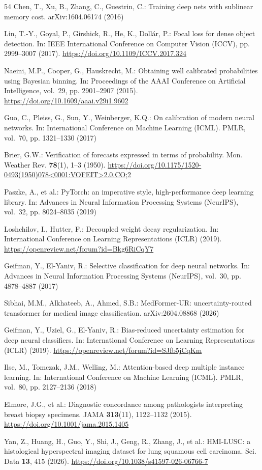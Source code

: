 \documentclass{svproc}
\begin{document}
\begin{thebibliography}{54}
Chen, T., Xu, B., Zhang, C., Guestrin, C.: Training deep nets with sublinear memory cost. arXiv:1604.06174 (2016)

Lin, T.-Y., Goyal, P., Girshick, R., He, K., Doll\'{a}r, P.: Focal loss for dense object detection. In: IEEE International Conference on Computer Vision (ICCV), pp. 2999--3007 (2017). \url{https://doi.org/10.1109/ICCV.2017.324}

Naeini, M.P., Cooper, G., Hauskrecht, M.: Obtaining well calibrated probabilities using Bayesian binning. In: Proceedings of the AAAI Conference on Artificial Intelligence, vol.~29, pp. 2901--2907 (2015). \url{https://doi.org/10.1609/aaai.v29i1.9602}

Guo, C., Pleiss, G., Sun, Y., Weinberger, K.Q.: On calibration of modern neural networks. In: International Conference on Machine Learning (ICML). PMLR, vol.~70, pp. 1321--1330 (2017)

Brier, G.W.: Verification of forecasts expressed in terms of probability. Mon. Weather Rev. \textbf{78}(1), 1--3 (1950). \url{https://doi.org/10.1175/1520-0493(1950)078<0001:VOFEIT>2.0.CO;2}

Paszke, A., et al.: PyTorch: an imperative style, high-performance deep learning library. In: Advances in Neural Information Processing Systems (NeurIPS), vol.~32, pp. 8024--8035 (2019)

Loshchilov, I., Hutter, F.: Decoupled weight decay regularization. In: International Conference on Learning Representations (ICLR) (2019). \url{https://openreview.net/forum?id=Bkg6RiCqY7}

Geifman, Y., El-Yaniv, R.: Selective classification for deep neural networks. In: Advances in Neural Information Processing Systems (NeurIPS), vol.~30, pp. 4878--4887 (2017)

Sibhai, M.M., Alkhateeb, A., Ahmed, S.B.: MedFormer-UR: uncertainty-routed transformer for medical image classification. arXiv:2604.08868 (2026)

Geifman, Y., Uziel, G., El-Yaniv, R.: Bias-reduced uncertainty estimation for deep neural classifiers. In: International Conference on Learning Representations (ICLR) (2019). \url{https://openreview.net/forum?id=SJfb5jCqKm}

Ilse, M., Tomczak, J.M., Welling, M.: Attention-based deep multiple instance learning. In: International Conference on Machine Learning (ICML). PMLR, vol.~80, pp. 2127--2136 (2018)

Elmore, J.G., et al.: Diagnostic concordance among pathologists interpreting breast biopsy specimens. JAMA \textbf{313}(11), 1122--1132 (2015). \url{https://doi.org/10.1001/jama.2015.1405}

Yan, Z., Huang, H., Guo, Y., Shi, J., Geng, R., Zhang, J., et al.: HMI-LUSC: a histological hyperspectral imaging dataset for lung squamous cell carcinoma. Sci. Data \textbf{13}, 415 (2026). \url{https://doi.org/10.1038/s41597-026-06766-7}

\end{thebibliography}
\end{document}
